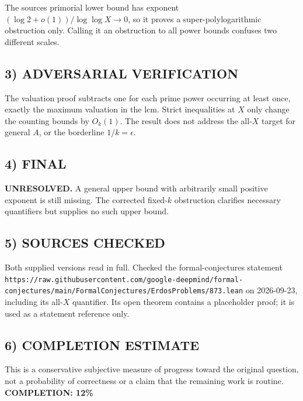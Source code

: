 The source\textquotesingle s primorial lower bound has exponent $(\log2+o(1))/\log\log X\to0$, so it proves a super-polylogarithmic obstruction only. Calling it an obstruction to all power bounds confuses two different scales.
\subsection{3) ADVERSARIAL VERIFICATION}
The valuation proof subtracts one for each prime power occurring at least once, exactly the maximum valuation in the lcm. Strict inequalities at $X$ only change the counting bounds by $O_k(1)$. The result does not address the all-$X$ target for general $A$, or the borderline $1/k=\epsilon$.
\subsection{4) FINAL}
\textbf{UNRESOLVED.}
A general upper bound with arbitrarily small positive exponent is still missing. The corrected fixed-$k$ obstruction clarifies necessary quantifiers but supplies no such upper bound.
\subsection{5) SOURCES CHECKED}
Both supplied versions read in full. Checked the formal-conjectures statement \texttt{https://raw.githubusercontent.com/google-deepmind/formal-conjectures/main/FormalConjectures/ErdosProblems/873.lean} on 2026-09-23, including its all-$X$ quantifier. Its open theorem contains a placeholder proof; it is used as a statement reference only.
\subsection{6) COMPLETION ESTIMATE}
This is a conservative subjective measure of progress toward the original question, not a probability of correctness or a claim that the remaining work is routine.
\textbf{COMPLETION: 12\%}
